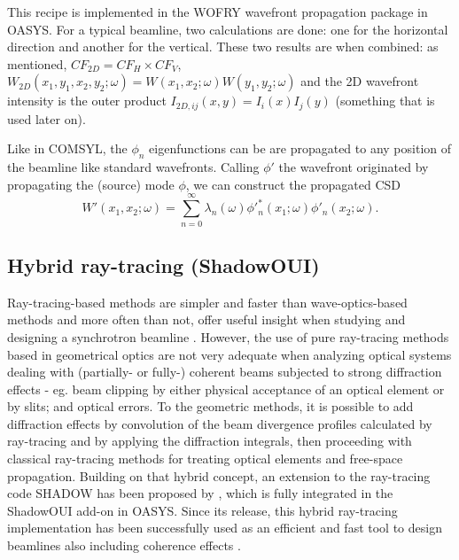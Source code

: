 \documentclass{iucr}              %
\begin{document}
This recipe is implemented in the WOFRY wavefront propagation package in OASYS. For a typical beamline, two calculations are done: one for the horizontal direction and another for the vertical. These two results are when combined: as mentioned, $CF_{2D}=CF_H \times CF_V$, $W_{2D}(x_1,y_1,x_2,y_2; \omega)=W(x_1,x_2;\omega) W(y_1,y_2;\omega)$ and the 2D wavefront intensity is the outer product $I_{2D,ij}(x,y)=I_i(x) I_j(y)$ (something that is used later on).

Like in COMSYL, the $\phi_n$ eigenfunctions can be are propagated to any position of the beamline like standard wavefronts. Calling $\phi'$ the wavefront originated by propagating the (source) mode $\phi$, we can construct the propagated CSD    
\begin{equation}
W'(x_1,x_2;\omega) = \sum_{n=0}^{\infty} \lambda_n(\omega) \phi'^{*}_n(x_1;\omega) \phi'_n(x_2;\omega).
\label{eq:propagatedCSD}
\end{equation}



\subsection{Hybrid ray-tracing (ShadowOUI)}

Ray-tracing-based methods are simpler and faster than wave-optics-based methods and more often than not, offer useful insight when studying and designing a synchrotron beamline \cite{hierarchical}. However, the use of pure ray-tracing methods based in geometrical optics are not very adequate when analyzing optical systems dealing with (partially- or fully-) coherent beams subjected to strong diffraction effects - eg. beam clipping by either physical acceptance of an optical element or by slits; and optical errors. To the geometric methods, it is possible to add diffraction effects by convolution of the beam divergence profiles calculated by ray-tracing and by applying the diffraction integrals, then proceeding with classical ray-tracing methods for treating optical elements and free-space propagation. Building on that hybrid concept, an extension to the ray-tracing code SHADOW \cite{codeSHADOW} has been proposed by , which is fully integrated in the ShadowOUI \cite{codeSHADOWOUI} add-on in OASYS. Since its release, this hybrid ray-tracing implementation has been successfully used as an efficient and fast tool to design beamlines also including coherence effects \cite{Shi2017,Luca2020, Lordano2022}.
\end{document}
